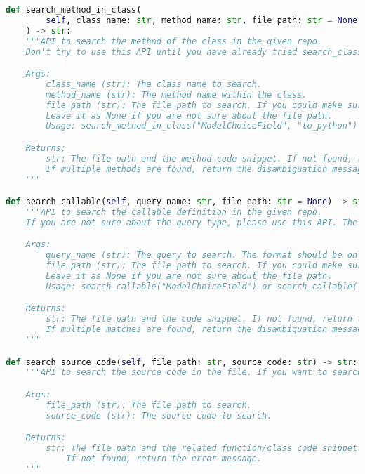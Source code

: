 \begin{lstlisting}[language=Python]
def search_method_in_class(
        self, class_name: str, method_name: str, file_path: str = None
    ) -> str:
    """API to search the method of the class in the given repo.
    Don't try to use this API until you have already tried search_class to get the class info.

    Args:
        class_name (str): The class name to search.
        method_name (str): The method name within the class.
        file_path (str): The file path to search. If you could make sure the file path, please provide it to avoid ambiguity.
        Leave it as None if you are not sure about the file path.
        Usage: search_method_in_class("ModelChoiceField", "to_python") or search_method_in_class("ModelChoiceField", "to_python", "django/forms/models.py")

    Returns:
        str: The file path and the method code snippet. If not found, return the error message.
        If multiple methods are found, return the disambiguation message.
    """

def search_callable(self, query_name: str, file_path: str = None) -> str:
    """API to search the callable definition in the given repo.
    If you are not sure about the query type, please use this API. The query can be a function, class, method or global variable.

    Args:
        query_name (str): The query to search. The format should be only the name.
        file_path (str): The file path to search. If you could make sure the file path, please provide it to avoid ambiguity.
        Leave it as None if you are not sure about the file path.
        Usage: search_callable("ModelChoiceField") or search_callable("ModelChoiceField", "django/forms/models.py")

    Returns:
        str: The file path and the code snippet. If not found, return the error message.
        If multiple matches are found, return the disambiguation message.
    """

def search_source_code(self, file_path: str, source_code: str) -> str:
    """API to search the source code in the file. If you want to search the code snippet in the file.

    Args:
        file_path (str): The file path to search.
        source_code (str): The source code to search.

    Returns:
        str: The file path and the related function/class code snippet.
            If not found, return the error message.
    """


\end{lstlisting}